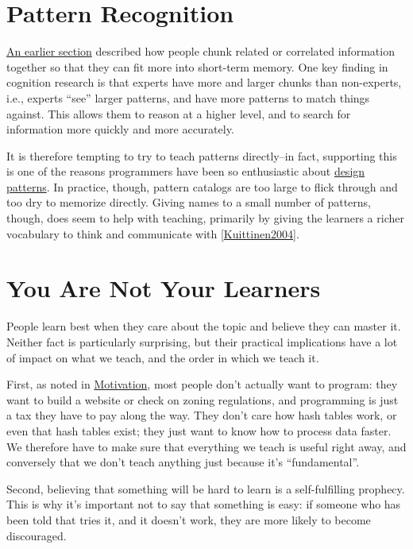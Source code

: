\documentclass[10pt,statementpaper]{memoir}
\begin{document}
\section{Pattern Recognition}\label{pattern-recognition}

\href{memory.html\#seven-plus-or-minus-two}{An earlier section}
described how people chunk related or correlated information together so
that they can fit more into short-term memory. One key finding in
cognition research is that experts have more and larger chunks than
non-experts, i.e., experts ``see'' larger patterns, and have more
patterns to match things against. This allows them to reason at a higher
level, and to search for information more quickly and more accurately.

It is therefore tempting to try to teach patterns directly--in fact,
supporting this is one of the reasons programmers have been so
enthusiastic about
\href{https://en.wikipedia.org/wiki/Software_design_pattern}{design
patterns}. In practice, though, pattern catalogs are too large to flick
through and too dry to memorize directly. Giving names to a small number
of patterns, though, does seem to help with teaching, primarily by
giving the learners a richer vocabulary to think and communicate with
{[}\href{biblio.html\#kuittinen-patterns}{Kuittinen2004}{]}.

\section{You Are Not Your Learners}\label{you-are-not-your-learners}

People learn best when they care about the topic and believe they can
master it. Neither fact is particularly surprising, but their practical
implications have a lot of impact on what we teach, and the order in
which we teach it.

First, as noted in \href{motivation.html}{Motivation}, most people don't
actually want to program: they want to build a website or check on
zoning regulations, and programming is just a tax they have to pay along
the way. They don't care how hash tables work, or even that hash tables
exist; they just want to know how to process data faster. We therefore
have to make sure that everything we teach is useful right away, and
conversely that we don't teach anything just because it's
``fundamental''.

Second, believing that something will be hard to learn is a
self-fulfilling prophecy. This is why it's important not to say that
something is easy: if someone who has been told that tries it, and it
doesn't work, they are more likely to become discouraged.
\end{document}
